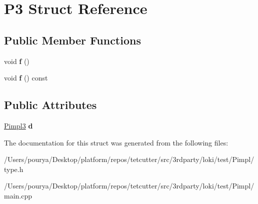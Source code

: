 \hypertarget{structP3}{}\section{P3 Struct Reference}
\label{structP3}
\subsection*{Public Member Functions}
\begin{DoxyCompactItemize}
\item 
\hypertarget{structP3_af76b0499a17e22dd64c1eb969366475b}{}void {\bfseries f} ()\label{structP3_af76b0499a17e22dd64c1eb969366475b}

\item 
\hypertarget{structP3_a98f989bba724febe28e65ce2a6553b3e}{}void {\bfseries f} () const \label{structP3_a98f989bba724febe28e65ce2a6553b3e}

\end{DoxyCompactItemize}
\subsection*{Public Attributes}
\begin{DoxyCompactItemize}
\item 
\hypertarget{structP3_a2331c6705def92319d5ab9e2781d5f7e}{}\hyperlink{classLoki_1_1Pimpl}{Pimpl3} {\bfseries d}\label{structP3_a2331c6705def92319d5ab9e2781d5f7e}

\end{DoxyCompactItemize}


The documentation for this struct was generated from the following files\+:\begin{DoxyCompactItemize}
\item 
/\+Users/pourya/\+Desktop/platform/repos/tetcutter/src/3rdparty/loki/test/\+Pimpl/type.\+h\item 
/\+Users/pourya/\+Desktop/platform/repos/tetcutter/src/3rdparty/loki/test/\+Pimpl/main.\+cpp\end{DoxyCompactItemize}
